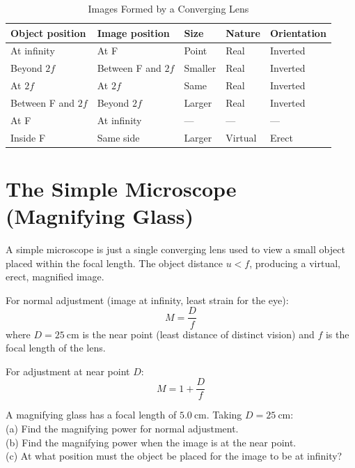 \begin{table}[H]
\centering
\caption{Images Formed by a Converging Lens}
\label{tab:lens_images}
\small
\begin{tabular}{p{3cm}p{2.5cm}p{2cm}p{2cm}p{2cm}}
\toprule
\textbf{Object position} & \textbf{Image position} &
\textbf{Size} & \textbf{Nature} &
\textbf{Orientation}\\
\midrule
At infinity & At F & Point & Real & Inverted\\
Beyond $2f$ & Between F and $2f$ & Smaller &
  Real & Inverted\\
At $2f$ & At $2f$ & Same & Real & Inverted\\
Between F and $2f$ & Beyond $2f$ & Larger &
  Real & Inverted\\
At F & At infinity & --- & --- & ---\\
Inside F & Same side & Larger & Virtual & Erect\\
\bottomrule
\end{tabular}
\end{table}

\section{The Simple Microscope (Magnifying Glass)}

\begin{processbox}
A simple microscope is just a single converging
lens used to view a small object placed within
the focal length. The object distance $u < f$,
producing a virtual, erect, magnified image.

For normal adjustment (image at infinity,
least strain for the eye):
\[
  M = \frac{D}{f}
\]
where $D = 25\ \text{cm}$ is the near point
(least distance of distinct vision) and $f$ is
the focal length of the lens.

For adjustment at near point $D$:
\[
  M = 1 + \frac{D}{f}
\]
\end{processbox}

\begin{examplebox}[20.4]
A magnifying glass has a focal length of $5.0\ \text{cm}$.
Taking $D = 25\ \text{cm}$:\\
(a) Find the magnifying power for normal adjustment.\\
(b) Find the magnifying power when the image is at
the near point.\\
(c) At what position must the object be placed for
the image to be at infinity?
\end{examplebox}

